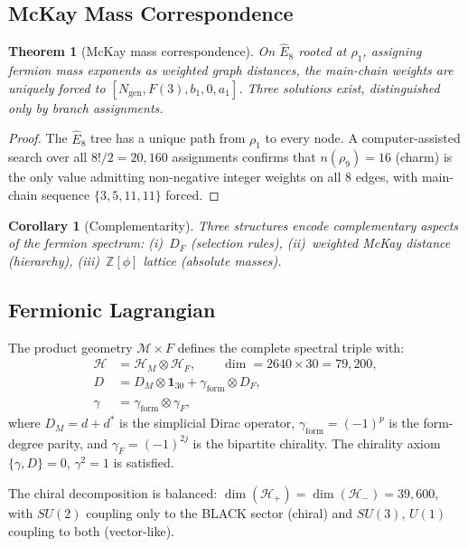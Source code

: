 \documentclass[12pt,a4paper]{article}
\newtheorem{theorem}{Theorem}
\newtheorem{corollary}{Corollary}
\theoremstyle{definition}
\begin{document}
\subsection{McKay Mass Correspondence}

\begin{theorem}[McKay mass correspondence]\label{thm:S-mckay-mass}
On $\hat{E}_8$ rooted at $\rho_1$, assigning fermion mass exponents as weighted graph distances, the main-chain weights are uniquely forced to $[N_{\mathrm{gen}}, F(3), b_1, 0, a_1]$.  Three solutions exist, distinguished only by branch assignments.
\end{theorem}

\begin{proof}
The $\hat{E}_8$ tree has a unique path from $\rho_1$ to every node.  A computer-assisted search over all $8!/2 = 20{,}160$ assignments confirms that $n(\rho_9) = 16$ (charm) is the only value admitting non-negative integer weights on all 8 edges, with main-chain sequence $\{3, 5, 11, 11\}$ forced.
\end{proof}

\begin{corollary}[Complementarity]\label{cor:S-complementarity}
Three structures encode complementary aspects of the fermion spectrum: (i)~$D_F$ (selection rules), (ii)~weighted McKay distance (hierarchy), (iii)~$\mathbb{Z}[\phi]$ lattice (absolute masses).
\end{corollary}

\subsection{Fermionic Lagrangian}

The product geometry $\mathcal{M} \times F$ defines the complete spectral triple with:
\begin{align}
\mathcal{H} &= \mathcal{H}_M \otimes \mathcal{H}_F, \qquad \dim = 2640 \times 30 = 79{,}200, \\
D &= D_M \otimes \mathbf{1}_{30} + \gamma_{\mathrm{form}} \otimes D_F, \\
\gamma &= \gamma_{\mathrm{form}} \otimes \gamma_F,
\end{align}
where $D_M = d + d^*$ is the simplicial Dirac operator, $\gamma_{\mathrm{form}} = (-1)^p$ is the form-degree parity, and $\gamma_F = (-1)^{2j}$ is the bipartite chirality.  The chirality axiom $\{\gamma, D\} = 0$, $\gamma^2 = 1$ is satisfied.

The chiral decomposition is balanced: $\dim(\mathcal{H}_+) = \dim(\mathcal{H}_-) = 39{,}600$, with $SU(2)$ coupling only to the BLACK sector (chiral) and $SU(3)$, $U(1)$ coupling to both (vector-like).
\end{document}
